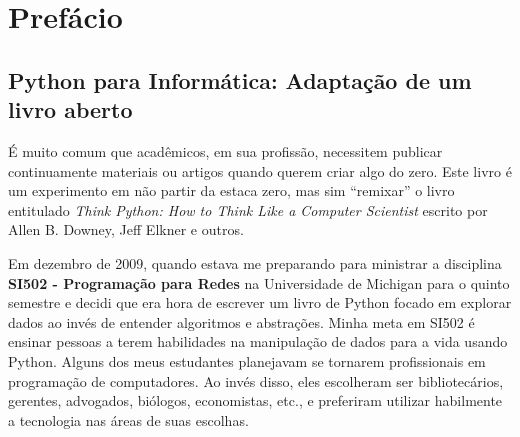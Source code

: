 
\chapter{Prefácio}

\section*{Python para Informática: Adaptação de um livro aberto}

É muito comum que acadêmicos, em sua profissão, necessitem publicar
continuamente materiais ou artigos quando querem criar algo do zero. Este livro
é um experimento em não partir da estaca zero, mas sim ``remixar'' o livro
entitulado \emph{Think Python: How to Think Like a Computer Scientist} escrito
por Allen B. Downey, Jeff Elkner e outros.


Em dezembro de 2009, quando estava me preparando para ministrar a disciplina
{\bf SI502 - Programação para Redes} na Universidade de Michigan para o
quinto semestre e decidi que era hora de escrever um livro de Python focado
em explorar dados ao invés de entender algoritmos e abstrações. Minha meta em
SI502 é ensinar pessoas a terem habilidades na manipulação de dados para a
vida usando Python.  Alguns dos meus estudantes planejavam se tornarem
profissionais em programação de computadores.  Ao invés disso, eles escolheram
ser bibliotecários, gerentes, advogados, biólogos, economistas, etc., e
preferiram utilizar habilmente a tecnologia nas áreas de suas escolhas.


